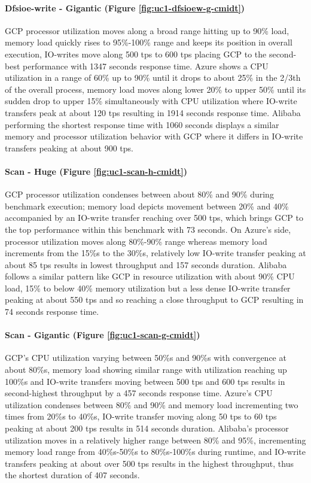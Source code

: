 \documentclass[review]{elsarticle}
\begin{document}
\paragraph{Dfsioe-write - Gigantic (Figure \ref{fig:uc1-dfsioew-g-cmidt})}GCP processor utilization moves along a broad range hitting up to 90\% load, memory load quickly rises to 95\%-100\% range and keeps its position in overall execution, IO-writes move along 500 tps to 600 tps placing GCP to the second-best performance with 1347 seconds response time. Azure shows a CPU utilization in a range of 60\% up to 90\% until it drops to about 25\% in the 2/3th of the overall process, memory load moves along lower 20\% to upper 50\% until its sudden drop to upper 15\% simultaneously with CPU utilization where IO-write transfers peak at about 120 tps resulting in 1914 seconds response time. Alibaba performing the shortest response time with 1060 seconds displays a similar memory and processor utilization behavior with GCP where it differs in IO-write transfers peaking at about 900 tps.

\paragraph{Scan - Huge (Figure \ref{fig:uc1-scan-h-cmidt})}GCP processor utilization condenses between about 80\% and 90\% during benchmark execution; memory load depicts movement between 20\% and 40\% accompanied by an IO-write transfer reaching over 500 tps, which brings GCP to the top performance within this benchmark with 73 seconds. On Azure's side, processor utilization moves along 80\%-90\% range whereas memory load increments from the 15\%s to the 30\%s, relatively low IO-write transfer peaking at about 85 tps results in lowest throughput and 157 seconds duration. Alibaba follows a similar pattern like GCP in resource utilization with about 90\% CPU load, 15\% to below 40\% memory utilization but a less dense IO-write transfer peaking at about 550 tps and so reaching a close throughput to GCP resulting in 74 seconds response time.

\paragraph{Scan - Gigantic (Figure \ref{fig:uc1-scan-g-cmidt})}GCP's CPU utilization varying between 50\%s and 90\%s with convergence at about 80\%s, memory load showing similar range with utilization reaching up 100\%s and IO-write transfers moving between 500 tps and 600 tps results in second-highest throughput by a 457 seconds response time. Azure's CPU utilization condenses between 80\% and 90\% and memory load incrementing two times from 20\%s to 40\%s, IO-write transfer moving along 50 tps to 60 tps peaking at about 200 tps results in 514 seconds duration. Alibaba's processor utilization moves in a relatively higher range between 80\% and 95\%, incrementing memory load range from 40\%s-50\%s to 80\%s-100\%s during runtime, and IO-write transfers peaking at about over 500 tps results in the highest throughput, thus the shortest duration of 407 seconds.
\end{document}
